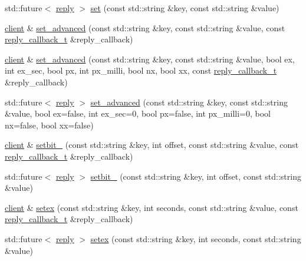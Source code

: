 \begin{DoxyCompactItemize}
\item 
std\+::future$<$ \hyperlink{classcpp__redis_1_1reply}{reply} $>$ \hyperlink{classcpp__redis_1_1client_a734ba95a7e2083fe6bc2e209f94ccab6}{set} (const std\+::string \&key, const std\+::string \&value)
\item 
\hyperlink{classcpp__redis_1_1client}{client} \& \hyperlink{classcpp__redis_1_1client_aac03b242d1a0948a9eb3567624e72622}{set\+\_\+advanced} (const std\+::string \&key, const std\+::string \&value, const \hyperlink{classcpp__redis_1_1client_a061a1140d36d2eaeda82b09a0bb3f9f2}{reply\+\_\+callback\+\_\+t} \&reply\+\_\+callback)
\item 
\hyperlink{classcpp__redis_1_1client}{client} \& \hyperlink{classcpp__redis_1_1client_a60db35e46bcbe36e5264ee04933162fd}{set\+\_\+advanced} (const std\+::string \&key, const std\+::string \&value, bool ex, int ex\+\_\+sec, bool px, int px\+\_\+milli, bool nx, bool xx, const \hyperlink{classcpp__redis_1_1client_a061a1140d36d2eaeda82b09a0bb3f9f2}{reply\+\_\+callback\+\_\+t} \&reply\+\_\+callback)
\item 
std\+::future$<$ \hyperlink{classcpp__redis_1_1reply}{reply} $>$ \hyperlink{classcpp__redis_1_1client_a208688fdc336009701256722ef7e2a2b}{set\+\_\+advanced} (const std\+::string \&key, const std\+::string \&value, bool ex=false, int ex\+\_\+sec=0, bool px=false, int px\+\_\+milli=0, bool nx=false, bool xx=false)
\item 
\hyperlink{classcpp__redis_1_1client}{client} \& \hyperlink{classcpp__redis_1_1client_a17ecd647ae2e9f11e331d1254a21e0d3}{setbit\+\_\+} (const std\+::string \&key, int offset, const std\+::string \&value, const \hyperlink{classcpp__redis_1_1client_a061a1140d36d2eaeda82b09a0bb3f9f2}{reply\+\_\+callback\+\_\+t} \&reply\+\_\+callback)
\item 
std\+::future$<$ \hyperlink{classcpp__redis_1_1reply}{reply} $>$ \hyperlink{classcpp__redis_1_1client_abbf3233f6c395c5d4bdf7810c80e6c05}{setbit\+\_\+} (const std\+::string \&key, int offset, const std\+::string \&value)
\item 
\hyperlink{classcpp__redis_1_1client}{client} \& \hyperlink{classcpp__redis_1_1client_a9c82e27a54dc86febda83f34142ea402}{setex} (const std\+::string \&key, int seconds, const std\+::string \&value, const \hyperlink{classcpp__redis_1_1client_a061a1140d36d2eaeda82b09a0bb3f9f2}{reply\+\_\+callback\+\_\+t} \&reply\+\_\+callback)
\item 
std\+::future$<$ \hyperlink{classcpp__redis_1_1reply}{reply} $>$ \hyperlink{classcpp__redis_1_1client_a14f1f1c9f50437585a8e758d1a004a67}{setex} (const std\+::string \&key, int seconds, const std\+::string \&value)

\end{DoxyCompactItemize}
